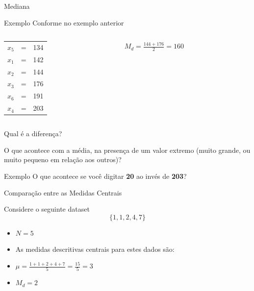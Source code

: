 \documentclass{beamer}
\begin{document}
\begin{frame}{Mediana}
  \begin{exampleblock}{Exemplo}
Conforme no exemplo anterior
    \begin{columns}
      \begin{column}{5cm}
        \begin{tabular}{ccc}
          $x_5$ &=&134\\
          $x_1$ &=&142\\
          $x_2$ &=&\alert{144}\\
          $x_3$ &=&\alert{176}\\
          $x_6$ &=&191\\
          $x_4$ &=&203\\
        \end{tabular}
      \end{column}
      \begin{column}{5cm}
        $M_d = \frac{144+176}{2}=160$
      \end{column}
    \end{columns}
  \end{exampleblock}
\end{frame}

\begin{frame}{Qual é a diferença?}
  \begin{block}{}
    O que acontece com a média, na presença de um valor extremo (muito grande, ou muito pequeno em relação aos outros)?
  \end{block}
  \begin{exampleblock}{Exemplo}
    O que acontece se você digitar {\bf 20} ao invés de {\bf 203}?
  \end{exampleblock}
\end{frame}

\begin{frame}{Comparação entre as Medidas Centrais}
  \begin{Example}Considere o seguinte dataset $$\{ 1,1,2,4,7\}$$
  \begin{itemize}
  \item $N=5$
  \item As medidas descritivas centrais para estes dados são:
  \item $\mu = \frac{1+1+2+4+7}{5} = \frac{15}{5}= 3$
  \item $M_d = 2$
  \end{itemize}
\end{Example}
\end{frame}
\end{document}
